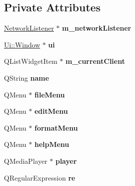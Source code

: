 \subsection*{Private Attributes}
\begin{DoxyCompactItemize}
\item 
\hypertarget{class_window_a8f714eb54bfde4b16da703584ac08eea}{}\hyperlink{class_network_listener}{Network\+Listener} $\ast$ {\bfseries m\+\_\+network\+Listener}\label{class_window_a8f714eb54bfde4b16da703584ac08eea}

\item 
\hypertarget{class_window_a25e6c90561394c36b5012b2c8e74a72c}{}\hyperlink{class_ui_1_1_window}{Ui\+::\+Window} $\ast$ {\bfseries ui}\label{class_window_a25e6c90561394c36b5012b2c8e74a72c}

\item 
\hypertarget{class_window_ad717ad597f2a1277c0bd8fac55c74825}{}Q\+List\+Widget\+Item $\ast$ {\bfseries m\+\_\+current\+Client}\label{class_window_ad717ad597f2a1277c0bd8fac55c74825}

\item 
\hypertarget{class_window_a277444918604b04869aeb9bfebeceb16}{}Q\+String {\bfseries name}\label{class_window_a277444918604b04869aeb9bfebeceb16}

\item 
\hypertarget{class_window_a09f6515f36fa10c11773997ff933b5bf}{}Q\+Menu $\ast$ {\bfseries file\+Menu}\label{class_window_a09f6515f36fa10c11773997ff933b5bf}

\item 
\hypertarget{class_window_a0eec65ab015e4594d6821559d36a9b16}{}Q\+Menu $\ast$ {\bfseries edit\+Menu}\label{class_window_a0eec65ab015e4594d6821559d36a9b16}

\item 
\hypertarget{class_window_a6f609551d5591985f173c8c68505335a}{}Q\+Menu $\ast$ {\bfseries format\+Menu}\label{class_window_a6f609551d5591985f173c8c68505335a}

\item 
\hypertarget{class_window_a20e4c75cbfaf22452a06f95d34b9f882}{}Q\+Menu $\ast$ {\bfseries help\+Menu}\label{class_window_a20e4c75cbfaf22452a06f95d34b9f882}

\item 
\hypertarget{class_window_a9da0abf47d6c11e6671aae6d4b3c671e}{}Q\+Media\+Player $\ast$ {\bfseries player}\label{class_window_a9da0abf47d6c11e6671aae6d4b3c671e}

\item 
\hypertarget{class_window_a0b96a9e43c5b611359ed1d0c4ecea4bb}{}Q\+Regular\+Expression {\bfseries re}\label{class_window_a0b96a9e43c5b611359ed1d0c4ecea4bb}


\end{DoxyCompactItemize}
